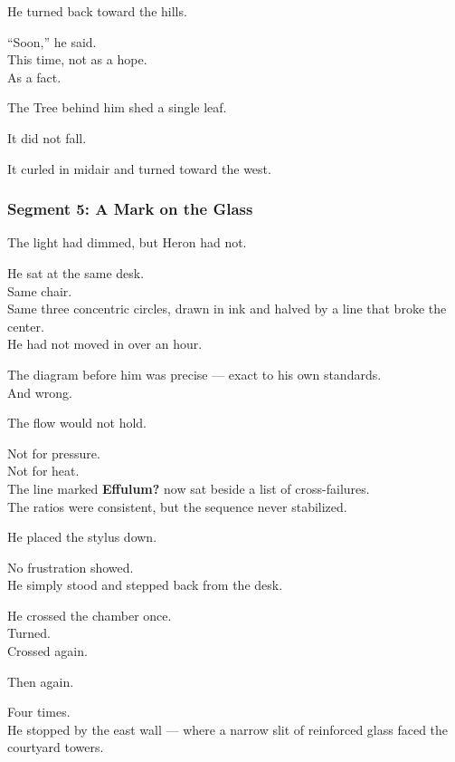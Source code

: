 \documentclass[9pt]{article}
\begin{document}
He turned back toward the hills.

“Soon,” he said.\\
This time, not as a hope.\\
As a fact.

\vspace{1em}

The Tree behind him shed a single leaf.

It did not fall.

It curled in midair and turned toward the west.

\newpage

\subsubsection*{Segment 5: A Mark on the Glass}

The light had dimmed, but Heron had not.

He sat at the same desk.\\
Same chair.\\
Same three concentric circles, drawn in ink and halved by a line that broke the center.\\
He had not moved in over an hour.

The diagram before him was precise — exact to his own standards.\\
And wrong.

\vspace{1em}

The flow would not hold.

Not for pressure.\\
Not for heat.\\
The line marked \textbf{Effulum?} now sat beside a list of cross-failures.\\
The ratios were consistent, but the sequence never stabilized.

\vspace{1em}

He placed the stylus down.

No frustration showed.\\
He simply stood and stepped back from the desk.

He crossed the chamber once.\\
Turned.\\
Crossed again.

Then again.

Four times.\\
He stopped by the east wall — where a narrow slit of reinforced glass faced the courtyard towers.
\end{document}
